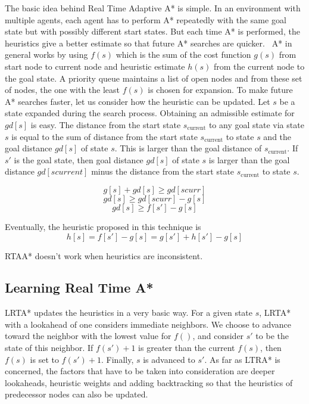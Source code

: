 \documentclass[tog]{acmsiggraph}
\begin{document}
The basic idea behind Real Time Adaptive A* is simple. In an
environment with multiple agents, each agent has to perform A*
repeatedly with the same goal state but with possibly different start
states. But each time A* is performed, the heuristics give a better
estimate so that future A* searches are quicker.~\cite{koenig2006real} A* in general works
by using \(f(s)\) which is the sum of the cost function \(g(s)\) from
start node to current node and heuristic estimate \(h(s)\) from the
current node to the goal state. A priority queue maintains a list of
open nodes and from these set of nodes, the one with the least
\(f(s)\) is chosen for expansion. To make future A* searches faster,
let us consider how the heuristic can be updated. Let \(s\) be a state
expanded during the search process. Obtaining an admissible estimate
for \(gd[s]\) is easy. The distance from the start state
\(s_\text{current}\) to any goal state via state \(s\) is equal to the
sum of distance from the start state \(s_\text{current}\) to state
\(s\) and the goal distance \(gd[s]\) of state \(s\). This is larger
than the goal distance of \(s_\text{current}\). If \(s'\) is the goal
state, then goal distance \(gd[s]\) of state \(s\) is larger than the
goal distance \(gd[scurrent]\) minus the distance from the start state
\(s_\text{current}\) to state \(s\).

\[ g[s] + gd[s] \geq gd[scurr] \]
\[ gd[s] \geq gd[scurr] - g[s] \]
\[ gd[s] \geq f[s'] - g[s] \]

Eventually, the heuristic proposed in this technique is
\[ h[s] = f[s'] - g[s] = g[s'] + h[s'] - g[s] \]

RTAA* doesn’t work when heuristics are inconsistent.

\subsection{Learning Real Time A*}

LRTA* updates the heuristics in a very basic way. For a given state
\(s\), LRTA* with a lookahead of one considers immediate neighbors. We
choose to advance toward the neighbor with the lowest value for
\(f()\), and consider \(s'\) to be the state of this neighbor. If
\(f(s') + 1\) is greater than the current \(f(s)\), then \(f(s)\) is
set to \(f(s') + 1\). Finally, \(s\) is advanced to \(s'\). As far as
LTRA* is concerned, the factors that have to be taken into
consideration are deeper lookaheads, heuristic weights and adding
backtracking so that the heuristics of predecessor nodes can also be
updated.
\end{document}
